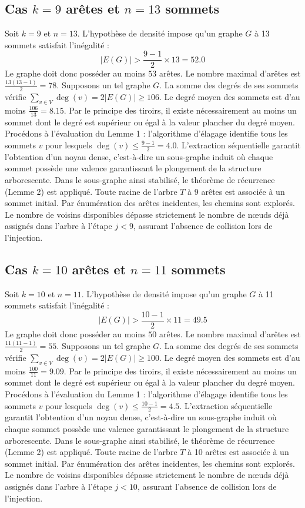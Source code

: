 \documentclass[12pt,a4paper]{article}
\begin{document}
\subsection{Cas $k = 9$ arêtes et $n = 13$ sommets}
Soit $k = 9$ et $n = 13$. L'hypothèse de densité impose qu'un graphe $G$ à 13 sommets satisfait l'inégalité :
$$ |E(G)| > \frac{9-1}{2} \times 13 = 52.0 $$
Le graphe doit donc posséder au moins $53$ arêtes. Le nombre maximal d'arêtes est $\frac{13(13-1)}{2} = 78$.
Supposons un tel graphe $G$. La somme des degrés de ses sommets vérifie $\sum_{v \in V} \deg(v) = 2|E(G)| \geq 106$.
Le degré moyen des sommets est d'au moins $\frac{106}{13} = 8.15$.
Par le principe des tiroirs, il existe nécessairement au moins un sommet dont le degré est supérieur ou égal à la valeur plancher du degré moyen.
Procédons à l'évaluation du Lemme 1 : l'algorithme d'élagage identifie tous les sommets $v$ pour lesquels $\deg(v) \leq \frac{9-1}{2} = 4.0$.
L'extraction séquentielle garantit l'obtention d'un noyau dense, c'est-à-dire un sous-graphe induit où chaque sommet possède une valence garantissant le plongement de la structure arborescente.
Dans le sous-graphe ainsi stabilisé, le théorème de récurrence (Lemme 2) est appliqué. Toute racine de l'arbre $T$ à 9 arêtes est associée à un sommet initial. Par énumération des arêtes incidentes, les chemins sont explorés. Le nombre de voisins disponibles dépasse strictement le nombre de nœuds déjà assignés dans l'arbre à l'étape $j < 9$, assurant l'absence de collision lors de l'injection.

\subsection{Cas $k = 10$ arêtes et $n = 11$ sommets}
Soit $k = 10$ et $n = 11$. L'hypothèse de densité impose qu'un graphe $G$ à 11 sommets satisfait l'inégalité :
$$ |E(G)| > \frac{10-1}{2} \times 11 = 49.5 $$
Le graphe doit donc posséder au moins $50$ arêtes. Le nombre maximal d'arêtes est $\frac{11(11-1)}{2} = 55$.
Supposons un tel graphe $G$. La somme des degrés de ses sommets vérifie $\sum_{v \in V} \deg(v) = 2|E(G)| \geq 100$.
Le degré moyen des sommets est d'au moins $\frac{100}{11} = 9.09$.
Par le principe des tiroirs, il existe nécessairement au moins un sommet dont le degré est supérieur ou égal à la valeur plancher du degré moyen.
Procédons à l'évaluation du Lemme 1 : l'algorithme d'élagage identifie tous les sommets $v$ pour lesquels $\deg(v) \leq \frac{10-1}{2} = 4.5$.
L'extraction séquentielle garantit l'obtention d'un noyau dense, c'est-à-dire un sous-graphe induit où chaque sommet possède une valence garantissant le plongement de la structure arborescente.
Dans le sous-graphe ainsi stabilisé, le théorème de récurrence (Lemme 2) est appliqué. Toute racine de l'arbre $T$ à 10 arêtes est associée à un sommet initial. Par énumération des arêtes incidentes, les chemins sont explorés. Le nombre de voisins disponibles dépasse strictement le nombre de nœuds déjà assignés dans l'arbre à l'étape $j < 10$, assurant l'absence de collision lors de l'injection.
\end{document}
